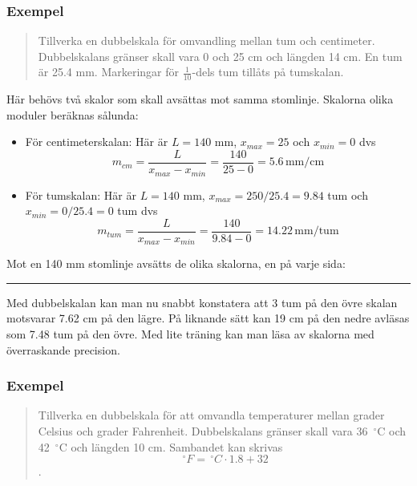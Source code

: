 \documentclass[oneside,11pt,a4paper,swedish]{scrbook}
\newcommand{\startex}[1]{\subsubsection{Exempel}\begin{quote}#1\end{quote}}
\newcommand{\slutex}{\begin{flushright} \rule{1ex}{1ex} \end{flushright}}
\begin{document}
\startex{Tillverka en dubbelskala för omvandling mellan tum och centimeter. Dubbelskalans gränser skall vara 0 och 25 cm och längden 14 cm. En tum är 25.4 mm. Markeringar för $\frac{1}{10}$-dels tum tillåts på tumskalan.}

Här behövs två skalor som skall avsättas mot samma stomlinje. Skalorna olika moduler beräknas sålunda:

\begin{itemize}
\item För centimeterskalan: Här är $L = 140$ mm, $x_{max}=25$  och $x_{min}=0$ dvs \[m_{cm} = \frac{L}{x_{max}-x_{min}}= \frac{140}{25-0} = 5.6\, \textrm{mm/cm} \]

\item För tumskalan: Här är $L = 140$ mm, $x_{max}=250/25.4=9.84$ tum och $x_{min}=0/25.4=0$ tum dvs \[m_{tum} = \frac{L}{x_{max}-x_{min}}= \frac{140}{9.84-0} = 14.22\, \textrm{mm/tum} \]
\end{itemize}

Mot en 140 mm stomlinje avsätts de olika skalorna, en på varje sida:


\slutex

Med dubbelskalan kan man nu snabbt konstatera att 3 tum på den övre skalan motsvarar 7.62 cm på den lägre. På liknande sätt kan 19 cm på den nedre avläsas som  7.48 tum på den övre. Med lite träning kan man läsa av skalorna med överraskande precision.




\startex{Tillverka en dubbelskala för att omvandla temperaturer mellan grader Celsius och grader Fahrenheit. Dubbelskalans gränser skall vara 36~$^\circ$C och 42~$^\circ$C och längden 10 cm. Sambandet kan skrivas \[\,^\circ F=\,^\circ C \cdot 1.8 + 32\].}
\end{document}
